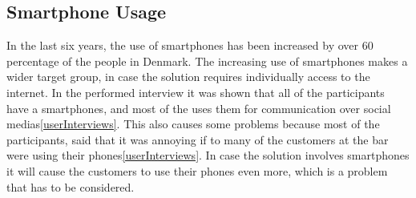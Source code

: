 \subsection{Smartphone Usage}
\label{sub:smartphone_usage}

In the last six years, the use of smartphones has been increased by over 60 percentage of the people in Denmark\cite{danmarksStatestkSmartphone}. The increasing use of smartphones makes a wider target group, in case the solution requires individually access to the internet. In the performed interview it was shown that all of the participants have a smartphones, and most of the uses them for communication over social medias\cref{userInterviews}. This also causes some problems because most of the participants, said that it was annoying if to many of the customers at the bar were using their phones\cref{userInterviews}. In case the solution involves smartphones it will cause the customers to use their phones even more, which is a problem that has to be considered. 
